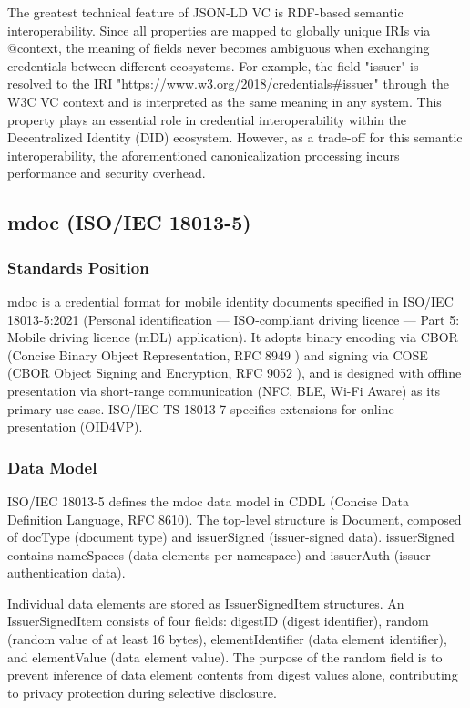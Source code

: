\documentclass[conference]{IEEEtran}
\begin{document}
The greatest technical feature of JSON-LD VC is RDF-based semantic interoperability. Since all properties are mapped to globally unique IRIs via @context, the meaning of fields never becomes ambiguous when exchanging credentials between different ecosystems. For example, the field "issuer" is resolved to the IRI "https://www.w3.org/2018/credentials\#issuer" through the W3C VC context and is interpreted as the same meaning in any system. This property plays an essential role in credential interoperability within the Decentralized Identity (DID) ecosystem. However, as a trade-off for this semantic interoperability, the aforementioned canonicalization processing incurs performance and security overhead.

\subsection{mdoc (ISO/IEC 18013-5)}

\subsubsection{Standards Position}

mdoc is a credential format for mobile identity documents specified in ISO/IEC 18013-5:2021 \cite{ref3} (Personal identification --- ISO-compliant driving licence --- Part 5: Mobile driving licence (mDL) application). It adopts binary encoding via CBOR (Concise Binary Object Representation, RFC 8949 \cite{ref12}) and signing via COSE (CBOR Object Signing and Encryption, RFC 9052 \cite{ref6}), and is designed with offline presentation via short-range communication (NFC, BLE, Wi-Fi Aware) as its primary use case. ISO/IEC TS 18013-7 specifies extensions for online presentation (OID4VP).

\subsubsection{Data Model}

ISO/IEC 18013-5 defines the mdoc data model in CDDL (Concise Data Definition Language, RFC 8610). The top-level structure is Document, composed of docType (document type) and issuerSigned (issuer-signed data). issuerSigned contains nameSpaces (data elements per namespace) and issuerAuth (issuer authentication data).

Individual data elements are stored as IssuerSignedItem structures. An IssuerSignedItem consists of four fields: digestID (digest identifier), random (random value of at least 16 bytes), elementIdentifier (data element identifier), and elementValue (data element value). The purpose of the random field is to prevent inference of data element contents from digest values alone, contributing to privacy protection during selective disclosure.
\end{document}
